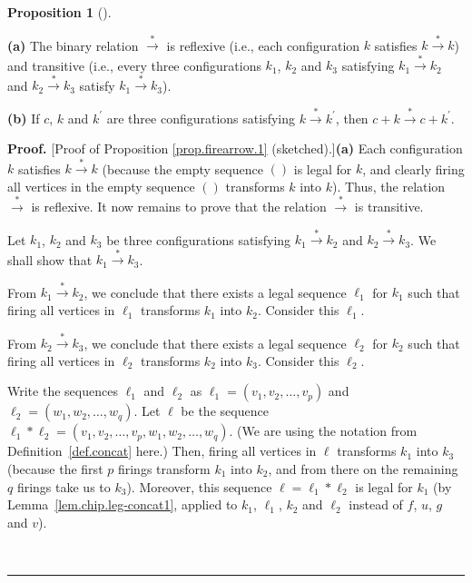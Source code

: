 \documentclass[numbers=enddot,12pt,final,onecolumn,notitlepage]{scrartcl}%
\theoremstyle{definition}
\newtheorem{prop}[theo]{Proposition}
\newenvironment{proposition}[1][]
{\begin{prop}[#1]\begin{leftbar}}
{\end{leftbar}\end{prop}}
\newenvironment{proof}[1][Proof]{\noindent\textbf{#1.} }{\ \rule{0.5em}{0.5em}}
\begin{document}
\begin{proposition}
\label{prop.firearrow.1}\textbf{(a)} The binary relation $\overset{\ast
}{\rightarrow}$ is reflexive (i.e., each configuration $k$ satisfies
$k\overset{\ast}{\rightarrow}k$) and transitive (i.e., every three
configurations $k_{1}$, $k_{2}$ and $k_{3}$ satisfying $k_{1}\overset{\ast
}{\rightarrow}k_{2}$ and $k_{2}\overset{\ast}{\rightarrow}k_{3}$ satisfy
$k_{1}\overset{\ast}{\rightarrow}k_{3}$).

\textbf{(b)} If $c$, $k$ and $k^{\prime}$ are three configurations satisfying
$k\overset{\ast}{\rightarrow}k^{\prime}$, then $c+k\overset{\ast}{\rightarrow
}c+k^{\prime}$.
\end{proposition}

\begin{proof}
[Proof of Proposition \ref{prop.firearrow.1} (sketched).]\textbf{(a)} Each
configuration $k$ satisfies $k\overset{\ast}{\rightarrow}k$ (because the empty
sequence $\left(  {}\right)  $ is legal for $k$, and clearly firing all
vertices in the empty sequence $\left(  {}\right)  $ transforms $k$ into $k$).
Thus, the relation $\overset{\ast}{\rightarrow}$ is reflexive. It now remains
to prove that the relation $\overset{\ast}{\rightarrow}$ is transitive.

Let $k_{1}$, $k_{2}$ and $k_{3}$ be three configurations satisfying
$k_{1}\overset{\ast}{\rightarrow}k_{2}$ and $k_{2}\overset{\ast}{\rightarrow
}k_{3}$. We shall show that $k_{1}\overset{\ast}{\rightarrow}k_{3}$.

From $k_{1}\overset{\ast}{\rightarrow}k_{2}$, we conclude that there exists a
legal sequence $\ell_{1}$ for $k_{1}$ such that firing all vertices in
$\ell_{1}$ transforms $k_{1}$ into $k_{2}$. Consider this $\ell_{1}$.

From $k_{2}\overset{\ast}{\rightarrow}k_{3}$, we conclude that there exists a
legal sequence $\ell_{2}$ for $k_{2}$ such that firing all vertices in
$\ell_{2}$ transforms $k_{2}$ into $k_{3}$. Consider this $\ell_{2}$.

Write the sequences $\ell_{1}$ and $\ell_{2}$ as $\ell_{1}=\left(  v_{1}%
,v_{2},\ldots,v_{p}\right)  $ and $\ell_{2}=\left(  w_{1},w_{2},\ldots
,w_{q}\right)  $. Let $\ell$ be the sequence $\ell_1 \ast \ell_2
= \left(  v_{1},v_{2},\ldots ,v_{p},w_{1},w_{2},\ldots,w_{q}\right)  $.
(We are using the notation from Definition~\ref{def.concat} here.)
Then, firing all vertices in
$\ell$ transforms $k_{1}$ into $k_{3}$ (because the first $p$ firings
transform $k_{1}$ into $k_{2}$, and from there on the remaining $q$ firings
take us to $k_{3}$). Moreover, this sequence
$\ell = \ell_1 \ast \ell_2$ is legal for $k_1$
(by Lemma~\ref{lem.chip.leg-concat1}, applied to
$k_1$, $\ell_1$, $k_2$ and $\ell_2$
instead of $f$, $u$, $g$ and $v$).


\end{proof}
\end{document}
